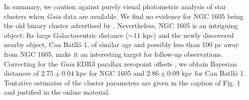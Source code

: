 \documentclass[RNAAS]{aastex631}
\begin{document}
In summary, we caution against purely visual photometric analysis of star clusters when {\it Gaia} data are available. We find no evidence for NGC 1605 being the old binary cluster advertised by \citet{Camargo2021}. Nevertheless, NGC 1605 is an intriguing object: Its large Galactocentric distance ($\sim 11$ kpc) and the newly discovered nearby object, Can Batlló 1, of similar age and possibly less than 100 pc away from NGC 1605, make it an interesting target for follow-up observations. Correcting for the {\it Gaia} EDR3 parallax zeropoint offsets \citep{Lindegren2021}, we obtain Bayesian distances of $2.75\pm 0.04$ kpc for NGC 1605 and $2.86\pm0.09$ kpc for Can Batlló 1. Tentative estimates of the cluster parameters are given in the caption of Fig. 1 and justified in the online material.




{}

\end{document}
